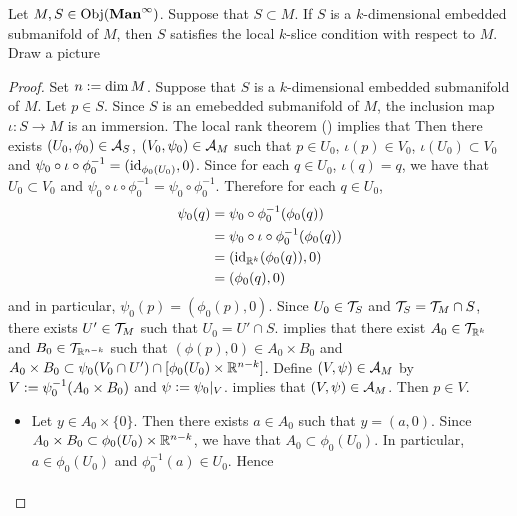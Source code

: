 \documentclass{book}
\begin{document}
	\begin{ex}
		Let $M,S \in \operatorname{Obj}(\operatorname*{\text{\textbf{Man}}^{\infty}})$. Suppose that $S \subset M$. If $S$ is a $k$-dimensional embedded submanifold of $M$, then $S$ satisfies the local $k$-slice condition with respect to $M$. \\
		 Draw a picture
	\end{ex}

	\begin{proof}
		Set $n \vcentcolon= \dim M$. Suppose that $S$ is a $k$-dimensional embedded submanifold of $M$. Let $p \in S$. Since $S$ is an emebedded submanifold of $M$, the inclusion map $\iota: S \rightarrow M$ is an immersion. The local rank theorem () implies that Then there exists $(U_0, \phi_0) \in \mathcal{A}_S$, $(V_0, \psi_0) \in \mathcal{A}_M$ such that $p \in U_0$, $\iota(p) \in V_0$, $\iota(U_0) \subset V_0$ and $\psi_0 \circ \iota \circ \phi_0^{-1} = (\operatorname{id}_{\phi_0(U_0)}, 0)$. Since for each $q \in U_0$, $\iota(q) = q$, we have that $U_0 \subset V_0$ and $\psi_0 \circ \iota \circ \phi_0^{-1} = \psi_0 \circ \phi_0^{-1}$. Therefore for each $q \in U_0$,
		\begin{align*}
			\psi_0(q)
			& =  \psi_0 \circ \phi_0^{-1} (\phi_0(q)) \\
			& = \psi_0 \circ \iota \circ \phi_0^{-1} (\phi_0(q)) \\
			& = (\operatorname{id}_{\mathbb{R}^k}(\phi_0(q)), 0) \\
			& = (\phi_0(q), 0)
		\end{align*}
		and in particular, $\psi_0(p) = (\phi_0(p), 0)$. Since $U_0 \in \mathcal{T}_S$ and $\mathcal{T}_S = \mathcal{T}_M \cap S$, there exists $U' \in \mathcal{T}_M$ such that $U_0 = U' \cap S$.  implies that there exist $A_0 \in \mathcal{T}_{\mathbb{R}^k}$ and $B_0 \in \mathcal{T}_{\mathbb{R}^{n-k}}$ such that $(\phi(p), 0) \in A_0 \times B_0$ and $A_0 \times B_0 \subset \psi_0(V_0 \cap U') \cap [\phi_0(U_0) \times \mathbb{R}^{n-k}]$. Define $(V, \psi) \in \mathcal{A}_{M}$ by $V \vcentcolon= \psi_0^{-1}(A_0 \times B_0)$ and $\psi \vcentcolon= \psi_0|_V$.  implies that $(V, \psi) \in \mathcal{A}_M$. Then $p \in V$. 
		\begin{itemize}
			\item Let $y \in A_0 \times \{0\}$. Then there exists $a \in A_0$ such that $y = (a,0)$. Since $A_0 \times B_0 \subset \phi_0(U_0) \times \mathbb{R}^{n-k}$, we have that $A_0 \subset \phi_0(U_0)$. In particular, $a \in \phi_0(U_0)$ and $\phi_0^{-1}(a) \in U_0$. Hence
			\begin{align*}

\end{align*}
\end{itemize}
\end{proof}
\end{document}
